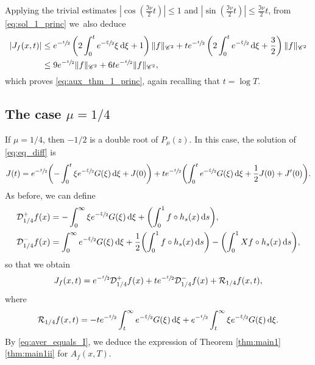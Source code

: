 \documentclass[10pt]{amsart}
\newcommand*{\diff}{\mathop{}\!\mathrm{d}}
\newcommand{\aver}[1]{A_{#1}(x,T)}
\theoremstyle{definition}
\begin{document}
Applying the trivial estimates $|\cos(\frac{\Im\nu}{2} t)|\leq 1$ and $|\sin(\frac{\Im\nu}{2} t)|\leq \frac{\Im\nu}{2} t$, from \eqref{eq:sol_1_princ} we~also deduce
\begin{equation*}
\begin{split}
|J_f(x,t)|&\leq e^{-\sfrac{t}{2}} \left(2 \int_0^t e^{-\sfrac{\xi}{2}} \xi \diff \xi +1\right) \|f\|_{\mathscr{C}^2} + t e^{-\sfrac{t}{2}} \left(2 \int_0^t e^{-\sfrac{\xi}{2}} \diff \xi +\frac{3}{2}\right) \|f\|_{\mathscr{C}^2}\\
& \leq 9 e^{-\sfrac{t}{2}} \|f\|_{\mathscr{C}^2} + 6t e^{-\sfrac{t}{2}} \|f\|_{\mathscr{C}^2},
\end{split}
\end{equation*}
which proves \eqref{eq:aux_thm_1_princ}, again recalling that $t = \log T$.

\subsection{The case $\mu = 1/4$}\label{sec:14}

If $\mu = 1/4$, then $-1/2$ is a double root of $P_\mu(z)$. In this case, the solution of \eqref{eq:eq_diff} is
\begin{equation*}
J(t) = e^{-\sfrac{t}{2}} \biggl(- \int_0^t \xi e^{-\sfrac{\xi}{2}} G(\xi) \diff \xi + J(0) \biggr) + t e^{-\sfrac{t}{2}} \biggl(\int_0^t e^{-\sfrac{\xi}{2}} G(\xi) \diff \xi + \frac{1}{2} J(0) + J'(0) \biggr).
\end{equation*}
As before, we can define
\begin{equation*}
\begin{split}
&\mathcal{D}_{1/4}^{+}f(x) = - \int_0^\infty \xi e^{-\sfrac{\xi}{2}} G(\xi) \diff \xi + \biggl(\int_0^1 f \circ h_s(x) \diff s \biggr),\\
&\mathcal{D}_{1/4}^{-}f(x) = \int_0^\infty e^{-\sfrac{\xi}{2}} G(\xi) \diff \xi + \frac{1}{2} \biggl(\int_0^1 f \circ h_s(x) \diff s \biggr) - \biggl(\int_0^1 Xf \circ h_s(x) \diff s \biggr),
\end{split}
\end{equation*}
so that we obtain
\begin{equation}\label{eq:I_mu_14}
J_{f}(x,t) = e^{-\sfrac{t}{2}} \mathcal{D}_{1/4}^{+}f(x) + t e^{-\sfrac{t}{2}} \mathcal{D}_{1/4}^{-}f(x) + \mathcal{R}_{1/4}f(x,t),
\end{equation}
where
\[
\mathcal{R}_{1/4}f(x,t) = - t e^{-\sfrac{t}{2}} \int_t^{\infty} e^{-\sfrac{\xi}{2}} G(\xi) \diff \xi + e^{-\sfrac{t}{2}} \int_t^{\infty} \xi e^{-\sfrac{\xi}{2}} G(\xi) \diff \xi.
\]
By \eqref{eq:aver_equals_I}, we deduce the expression of Theorem \ref{thm:main1}\eqref{thm:main1ii} for $\aver{f}$.
\end{document}
